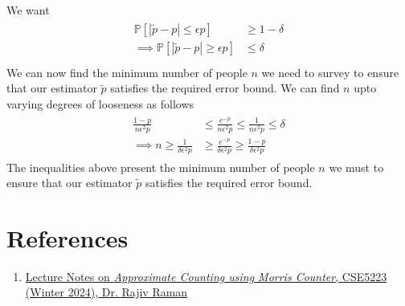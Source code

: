 \documentclass[9pt]{article}
\newcommand{\Probability}[1]{\mathbb{P}\left[ #1 \right]}
\begin{document}
We want
\begin{align}
    \begin{split}
        \Probability{\left| \tilde{p} - p \right| \leq \epsilon p} &\geq 1 - \delta \\
        \implies
        \Probability{\left| \tilde{p} - p \right| \geq \epsilon p} &\leq \delta \\
    \end{split}
\end{align}
We can now find the minimum number of people $n$ we need to survey to ensure that
our estimator $\tilde{p}$ satisfies the required error bound. We can find $n$ upto
varying degrees of looseness as follows
\vfill
\begin{align}
    \begin{split}
        \frac{1 - p}{n \epsilon^{2} p} &\leq \frac{e^{-p}}{n \epsilon^{2} p}
        \leq \frac{1}{n \epsilon^{2} p} \leq \delta \\
        \implies n \geq \frac{1}{\delta \epsilon^{2} p} &\geq \frac{e^{-p}}{\delta \epsilon^{2} p}
        \geq \frac{1 - p}{\delta \epsilon^{2} p}
    \end{split}
\end{align}
The inequalities above present the minimum number of people $n$ we must to ensure that our
estimator $\tilde{p}$ satisfies the required error bound.

\vfill

\section*{References}
\begin{enumerate}
    \item \href{https://drive.google.com/file/d/1fsjxaczfe_vfDVeBlToF6bUzV_rqzGPu/view}
    {Lecture Notes on \textit{Approximate Counting using Morris Counter}, CSE5223
    (Winter 2024), Dr. Rajiv Raman}
\end{enumerate}
\end{document}
